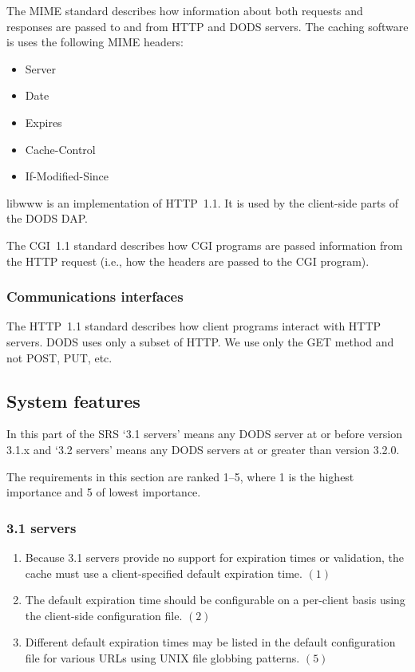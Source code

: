 \documentclass{article}
\begin{document}
The MIME standard describes how information about both requests and responses
are passed to and from HTTP and DODS servers. The caching software is uses
the following MIME headers:
\begin{itemize}
\item Server
\item Date
\item Expires
\item Cache-Control
\item If-Modified-Since 
\end{itemize}

libwww is an implementation of HTTP~1.1. It is used by the client-side parts
of the DODS \ac{DAP}.

The CGI~1.1 standard describes how CGI programs are passed information from
the HTTP request (i.e., how the headers are passed to the CGI program).

\subsubsection{Communications interfaces}
The HTTP~1.1 standard describes how client programs interact with HTTP
servers. DODS uses only a subset of HTTP. We use only the GET method and not
POST, PUT, etc.

\subsection{System features}
In this part of the \ac{SRS} `3.1 servers' means any DODS server at or before
version 3.1.x and `3.2 servers' means any DODS servers at or greater than
version 3.2.0.

The requirements in this section are ranked 1--5, where 1 is the highest
importance and 5 of lowest importance.

\subsubsection{3.1 servers}
\begin{enumerate}
\item Because 3.1 servers provide no support for expiration times or
  validation, the cache must use a client-specified default expiration time.
  $(1)$
\item The default expiration time should be configurable on a per-client
  basis using the client-side configuration file. $(2)$
\item Different default expiration times may be listed in the default
  configuration file for various URLs using UNIX file globbing patterns. $(5)$
\end{enumerate}
\end{document}
